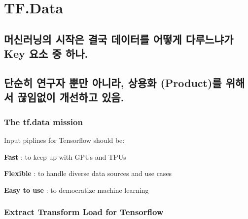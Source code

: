 \documentclass[11pt]{article}
\begin{document}
    \hypertarget{tf.data}{%
\section{TF.Data}\label{tf.data}}

\hypertarget{uxba38uxc2e0uxb7ecuxb2dduxc758-uxc2dcuxc791uxc740-uxacb0uxad6d-uxb370uxc774uxd130uxb97c-uxc5b4uxb5bbuxac8c-uxb2e4uxb8e8uxb290uxb0d0uxac00-key-uxc694uxc18c-uxc911-uxd558uxb098.}{%
\subsection{머신러닝의 시작은 결국 데이터를 어떻게 다루느냐가 Key 요소
중
하나.}\label{uxba38uxc2e0uxb7ecuxb2dduxc758-uxc2dcuxc791uxc740-uxacb0uxad6d-uxb370uxc774uxd130uxb97c-uxc5b4uxb5bbuxac8c-uxb2e4uxb8e8uxb290uxb0d0uxac00-key-uxc694uxc18c-uxc911-uxd558uxb098.}}

\hypertarget{uxb2e8uxc21cuxd788-uxc5f0uxad6cuxc790-uxbfd0uxb9cc-uxc544uxb2c8uxb77c-uxc0c1uxc6a9uxd654-productuxb97c-uxc704uxd574uxc11c-uxb04auxc784uxc5c6uxc774-uxac1cuxc120uxd558uxace0-uxc788uxc74c.}{%
\subsection{단순히 연구자 뿐만 아니라, 상용화 (Product)를 위해서
끊임없이 개선하고
있음.}\label{uxb2e8uxc21cuxd788-uxc5f0uxad6cuxc790-uxbfd0uxb9cc-uxc544uxb2c8uxb77c-uxc0c1uxc6a9uxd654-productuxb97c-uxc704uxd574uxc11c-uxb04auxc784uxc5c6uxc774-uxac1cuxc120uxd558uxace0-uxc788uxc74c.}}

\hypertarget{the-tf.data-mission}{%
\subsubsection{\texorpdfstring{\textbf{The tf.data
mission}}{The tf.data mission}}\label{the-tf.data-mission}}

Input piplines for Tensorflow should be:

\textbf{Fast} : to keep up with GPUs and TPUs

\textbf{Flexible} : to handle diverse data sources and use cases

\textbf{Easy to use} : to democratize machine learning

    \hypertarget{extract-transform-load-for-tensorflow}{%
\subsubsection{Extract Transform Load for
Tensorflow}\label{extract-transform-load-for-tensorflow}}
\end{document}
